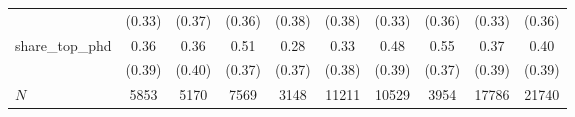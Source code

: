 {\begin{tabular}{l*{9}{c}}
            &      (0.33)&      (0.37)&      (0.36)&      (0.38)&      (0.38)&      (0.33)&      (0.36)&      (0.33)&      (0.36)\\
share\_top\_phd&        0.36&        0.36&        0.51&        0.28&        0.33&        0.48&        0.55&        0.37&        0.40\\
            &      (0.39)&      (0.40)&      (0.37)&      (0.37)&      (0.38)&      (0.39)&      (0.37)&      (0.39)&      (0.39)\\
\hline
\(N\)       &        5853&        5170&        7569&        3148&       11211&       10529&        3954&       17786&       21740\\
\hline\hline
\end{tabular}
}
